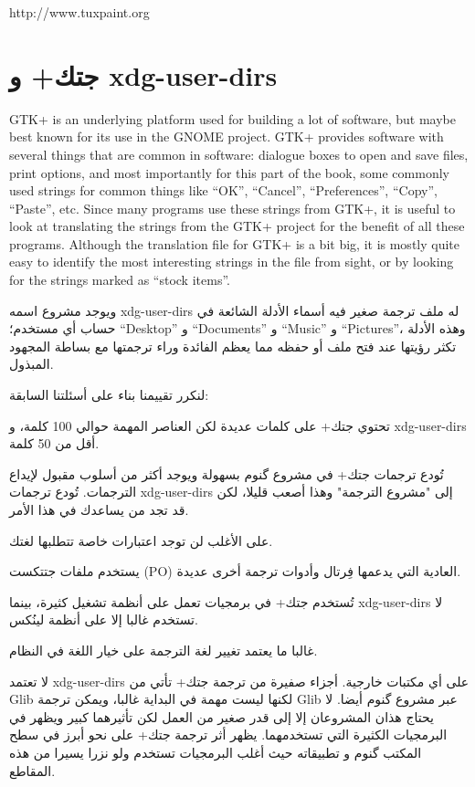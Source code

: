 http://www.tuxpaint.org

\section{جتك+ و xdg-user-dirs}
GTK+ is an underlying platform used for building a lot of software, but
maybe best known for its use in the GNOME project. GTK+ provides
software with several things that are common in software: dialogue
boxes to open and save files, print options, and most importantly for
this part of the book, some commonly used strings for common things
like “OK”, “Cancel”, “Preferences”, “Copy”, “Paste”, etc. Since many
programs use these strings from GTK+, it is useful to look at
translating the strings from the GTK+ project for the benefit of all
these programs. Although the translation file for GTK+ is a bit big, it
is mostly quite easy to identify the most interesting strings in the
file from sight, or by looking for the strings marked as “stock items”.

ويوجد مشروع اسمه xdg-user-dirs له ملف ترجمة صغير فيه أسماء الأدلة
الشائعة في حساب أي مستخدم؛ “Desktop” و “Documents” و “Music” و
“Pictures”، وهذه الأدلة تكثر رؤيتها عند فتح ملف أو حفظه مما يعظم
الفائدة وراء ترجمتها مع بساطة المجهود المبذول.

لنكرر تقييمنا بناء على أسئلتنا السابقة:

\startitemize[1]
\item تحتوي جتك+ على كلمات عديدة لكن العناصر المهمة حوالي 100 كلمة، و
xdg-user-dirs أقل من 50 كلمة.
\item تُودع ترجمات جتك+ في مشروع گنوم بسهولة ويوجد أكثر من أسلوب مقبول
لإيداع الترجمات. تُودع ترجمات xdg-user-dirs إلى "مشروع الترجمة" وهذا
أصعب قليلا، لكن قد تجد من يساعدك في هذا الأمر.
\item على الأغلب لن توجد اعتبارات خاصة تتطلبها لغتك.
\item يستخدم ملفات جتتكست (PO) العادية التي يدعمها فِرتال وأدوات ترجمة
أخرى عديدة.
\item تُستخدم جتك+ في برمجيات تعمل على أنظمة تشغيل كثيرة، بينما
xdg-user-dirs لا تستخدم غالبا إلا على أنظمة لينُكس.
\item غالبا ما يعتمد تغيير لغة الترجمة على خيار اللغة في النظام.
\item لا تعتمد xdg-user-dirs على أي مكتبات خارجية. أجزاء صفيرة من ترجمة
جتك+ تأتي من Glib لكنها ليست مهمة في البداية غالبا، ويمكن ترجمة Glib
عبر مشروع گنوم أيضا.
\stopitemize
لا يحتاج هذان المشروعان إلا إلى قدر صغير من العمل لكن تأثيرهما كبير
ويظهر في البرمجيات الكثيرة التي تستخدمهما. يظهر أثر ترجمة جتك+ على نحو
أبرز في سطح المكتب گنوم و تطبيقاته حيث أغلب البرمجيات تستخدم ولو نزرا
يسيرا من هذه المقاطع.

